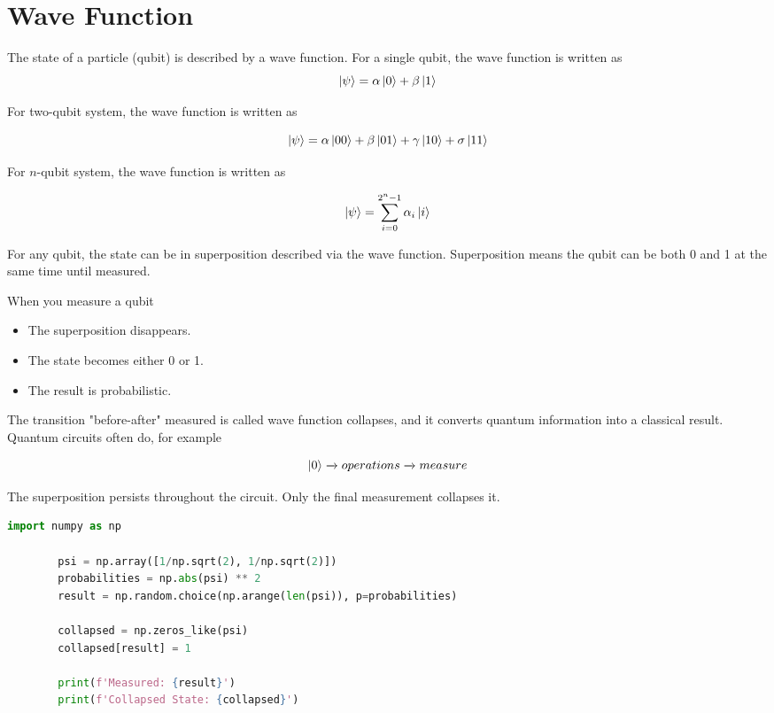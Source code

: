 \documentclass[11pt]{article}
\begin{document}
    \section*{Wave Function}

    \indent The state of a particle (qubit) is described by a wave function.
    For a single qubit, the wave function is written as
    \[
        \ket{\psi} = \alpha\ket{0} + \beta\ket{1}
    \]

    For two-qubit system, the wave function is written as

    \[
        \ket{\psi} = \alpha\ket{00} + \beta\ket{01} + \gamma\ket{10} + \sigma\ket{11}
    \]

    For $n$-qubit system, the wave function is written as

    \[
        \ket{\psi} = \sum_{i=0}^{2^n - 1}\alpha_i\ket{i}
    \]

    For any qubit, the state can be in superposition described via the wave function.
    Superposition means the qubit can be both 0 and 1 at the same time until measured.

    When you measure a qubit
    \begin{itemize}
        \item The superposition disappears.
        \item The state becomes either 0 or 1.
        \item The result is probabilistic.
    \end{itemize}

    The transition "before-after" measured is called wave function collapses, and it converts quantum information into a classical result.
    Quantum circuits often do, for example

    \[
        \ket{0} \xrightarrow{} operations \xrightarrow{} measure
    \]

    The superposition persists throughout the circuit.
    Only the final measurement collapses it.

    \newpage

    \begin{lstlisting}[language=Python, caption={Measurement procedure in single qubit system},label={lst:lstlisting22}, captionpos=b]
        import numpy as np

        psi = np.array([1/np.sqrt(2), 1/np.sqrt(2)])
        probabilities = np.abs(psi) ** 2
        result = np.random.choice(np.arange(len(psi)), p=probabilities)

        collapsed = np.zeros_like(psi)
        collapsed[result] = 1

        print(f'Measured: {result}')
        print(f'Collapsed State: {collapsed}')
    \end{lstlisting}
\end{document}
